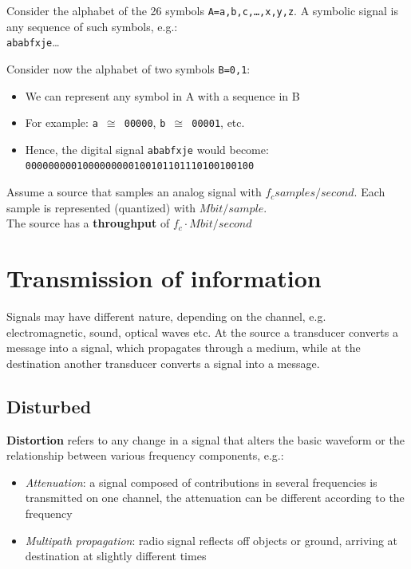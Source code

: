 \begin{definition}
   Consider the alphabet of the 26 symbols \texttt{A={a,b,c,\dots,x,y,z}}.
   A symbolic signal is any sequence of such symbols, e.g.:\\
   \texttt{ababfxje}\dots
   
   Consider now the alphabet of two symbols \texttt{B={0,1}}:
   \begin{itemize}
      \item We can represent any symbol in A with a sequence in B
      \item For example: \texttt{a $\cong$ 00000}, \texttt{b $\cong$ 00001}, etc.
      \item Hence, the digital signal \texttt{ababfxje} would become:\\
      \texttt{0000000001000000000100101101110100100100}
   \end{itemize}

   Assume a source that samples an analog signal with $f_c samples/second$.
   Each sample is represented (quantized) with $M bit/sample$.\\
   The source has a \textbf{throughput} of $f_c \cdot M bit/second$


\end{definition}

\section{Transmission of information}
Signals may have different nature,
depending on the channel, e.g. electromagnetic, sound, optical waves etc.
At the source a transducer converts a
message into a signal, which propagates
through a medium, while at the destination another transducer converts a signal into a message.

\subsection{Disturbed}
\textbf{Distortion} refers to any change in a signal that alters the basic waveform or the
relationship between various
frequency components, e.g.:
\begin{itemize}
   \item \textit{Attenuation}: a signal composed of contributions in several frequencies is
   transmitted on one channel, the attenuation can be different according to
   the frequency
   \item \textit{Multipath propagation}: radio signal reflects off objects or ground, arriving at destination at slightly different times
\end{itemize}

